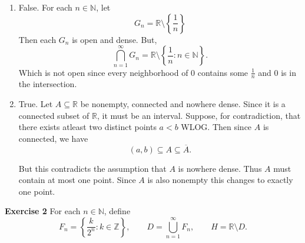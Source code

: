 \documentclass[12pt]{article}
\begin{document}
\begin{enumerate}[label=(\alph*)]
    \item False. For each \( n \in \mathbb{N} \), let
          \[
              G_n = \mathbb{R} \setminus \left\{\frac{1}{n}\right\}
          \]
          Then each \( G_n \) is open and dense. But,
          \[
              \bigcap_{n=1}^{\infty} G_n = \mathbb{R} \setminus \left\{\frac{1}{n} : n \in \mathbb{N} \right\}.
          \]
          Which is not open since every neighborhood of 0 contains some \( \frac{1}{n} \) and \( 0 \) is in the intersection.


    \item True. Let \( A \subseteq \mathbb{R} \) be nonempty, connected and nowhere dense. Since it is a connected subset of \( \mathbb{R} \), it must be an interval. Suppose, for contradiction, that there exists atleast two distinct points \( a < b \) WLOG. Then since \( A \) is connected, we have
          \[
              (a,b) \subseteq A \subseteq \overline{A}.
          \]

          But this contradicts the assumption that \( A \) is nowhere dense. Thus \( A \) must contain at most one point. Since \( A  \) is also nonempty this changes to exactly one point.

\end{enumerate}

\textbf{Exercise 2}
For each \( n \in \mathbb{N} \), define
\[
    F_n = \left\{\frac{k}{2^n} : k \in \mathbb{Z}\right\}, \qquad D = \bigcup_{n=1}^{\infty} F_n, \qquad H = \mathbb{R} \setminus D.
\]
\end{document}
